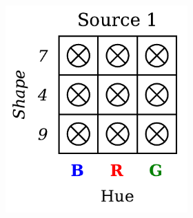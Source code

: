 \begin{definition}
\begin{figure}[H]
        \begin{subfigure}[b]{0.45\textwidth}
            \centering
            \begin{subfigure}[b]{0.48\textwidth}
                \centering
                \includegraphics[width=\textwidth]{img/datasets/ZSO_fact=hue_env=0.pdf}
            \end{subfigure}
            \begin{subfigure}[b]{0.48\textwidth}
                \centering

\end{subfigure}
\end{subfigure}
\end{figure}
\end{definition}
